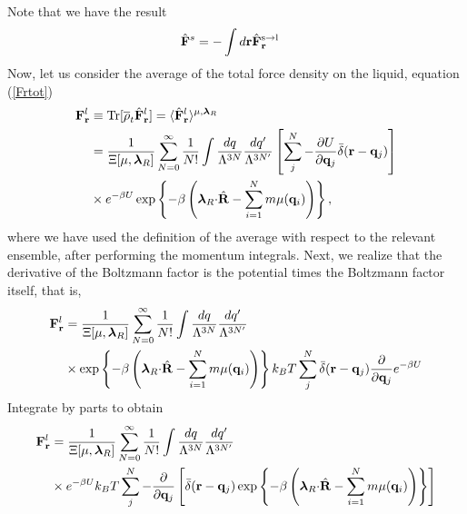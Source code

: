 \documentclass[b5paper,openright,10pt]{book}
\begin{document}
\begin{appendices}
Note that we have the result
\begin{align}
    \hat{\bf F}^s&= -\int d{\bf r}\hat{\bf F}^{\rm s\to l}_{\bf r}
\end{align}
Now, let us consider the average of the total force density on the liquid, equation (\ref{Frtot})
\begin{align}
{\bf F}^l_{\bf r} &\equiv{\rm Tr}[\overline{\rho}_t \hat{\bf F}^l_{\bf r}] =
 \langle \hat{\bf F}^l_{\bf r}\rangle^{\mu,\boldsymbol{\lambda}_R}
\nonumber\\
&=
\frac{1}{\Xi[\mu,\boldsymbol{\lambda}_R]}
 \sum_{N=0}^\infty \frac{1}{N!}
\int \frac{dq}{\Lambda^{3N}}\frac{dq'}{\Lambda^{3N'}}
\left[\sum^{N}_{j}-\frac{\partial U}{\partial {\bf q}_{j}}\bar{\delta}({\bf r}-{\bf q}_j)\right]
\nonumber\\
&\times e^{-\beta U}
\exp\left\{-\beta  \left( \boldsymbol{\lambda}_R{\cdot}\hat{\bf R}
-\sum_{i=1}^N m\mu({\bf q}_i)\right)\right\},
\end{align}
where we have  used the definition of the average  with respect to the
relevant ensemble,  after performing the momentum  integrals. Next, we
realize that the  derivative of the Boltzmann factor  is the potential
times the Boltzmann factor itself, that is,
\begin{align}
{\bf F}^l_{\bf r}&=
\frac{1}{\Xi[\mu,\boldsymbol{\lambda}_R]}
 \sum_{N=0}^\infty \frac{1}{N!}
\int \frac{dq}{\Lambda^{3N}}\frac{dq'}{\Lambda^{3N'}}
\nonumber\\
&\times \exp\left\{-\beta  \left(\boldsymbol{\lambda}_R{\cdot}\hat{\bf R}
-\sum_{i=1}^N m\mu({\bf   q}_i)\right)\right\}
k_BT\sum^{N}_{j}\bar{\delta}({\bf r}-{\bf q}_j)\frac{\partial }{\partial {\bf q}_{j}}e^{-\beta U}
\end{align}
Integrate by parts to obtain
\begin{align}
{\bf F}^l_{\bf r}&=
\frac{1}{\Xi[\mu,\boldsymbol{\lambda}_R]}
 \sum_{N=0}^\infty \frac{1}{N!}
\int \frac{dq}{\Lambda^{3N}}\frac{dq'}{\Lambda^{3N'}}
\nonumber \\
&\times
e^{-\beta U}
k_BT\sum^{N}_{j}-\frac{\partial }{\partial {\bf q}_{j}}\left[\bar{\delta}({\bf r}-{\bf q}_j)
\exp\left\{-\beta  \left( \boldsymbol{\lambda}_R{\cdot}\hat{\bf R}
-\sum_{i=1}^N m\mu({\bf q}_i)\right)\right\}\right]
\nonumber\\

\end{align}
\end{appendices}
\end{document}
